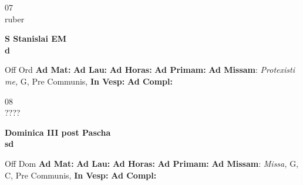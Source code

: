 \documentclass[10pt, openany]{book}
\begin{document}
    \begin{center}
        \begin{minipage}{3.5in}
            \vspace{2em}
            \begin{minipage}{0.5in}
                {\Huge 07} \\
                {\normalsize ruber}
            \end{minipage}
            \begin{minipage}{3.0in}
                \textbf{ \large S Stanislai EM \\
                \textnormal{\normalsize d}}

            \end{minipage}
            \begin{justify}Off Ord
                \textbf{Ad Mat: }
                \textbf{Ad Lau: }
                \textbf{Ad Horas: }
                \textbf{Ad Primam: }\textbf{Ad Missam}: \textit{Protexisti me,} G, Pre Communis, 
                \textbf{In Vesp: }
                \textbf{Ad Compl: }
            \end{justify}
        \end{minipage}
    \end{center}

    \begin{center}
        \begin{minipage}{3.5in}
            \vspace{2em}
            \begin{minipage}{0.5in}
                {\Huge 08} \\
                {\normalsize ????}
            \end{minipage}
            \begin{minipage}{3.0in}
                \textbf{ \large Dominica III post Pascha \\
                \textnormal{\normalsize sd}}

            \end{minipage}
            \begin{justify}Off Dom
                \textbf{Ad Mat: }
                \textbf{Ad Lau: }
                \textbf{Ad Horas: }
                \textbf{Ad Primam: }\textbf{Ad Missam}: \textit{Missa,} G, C, Pre Communis, 
                \textbf{In Vesp: }
                \textbf{Ad Compl: }
            \end{justify}
        \end{minipage}
    \end{center}
\end{document}

